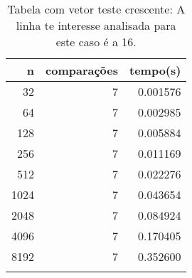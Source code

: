 \begin{table}[ht]
\centering
\begin{tabular}{rrr} \toprule
        n &    comparações &       tempo(s) \\ \midrule
      32  &              7 &      0.001576 \\
      64  &              7 &      0.002985 \\
     128  &              7 &      0.005884 \\
     256  &              7 &      0.011169 \\
     512  &              7 &      0.022276 \\
    1024  &              7 &      0.043654 \\
    2048  &              7 &      0.084924 \\
    4096  &              7 &      0.170405 \\
    8192  &              7 &      0.352600 \\
\bottomrule\addlinespace
\end{tabular}
\caption{Tabela com vetor teste crescente: A linha te interesse analisada para este caso é a 16.}
\label{tab:radixsortCrescente}
\end{table}

